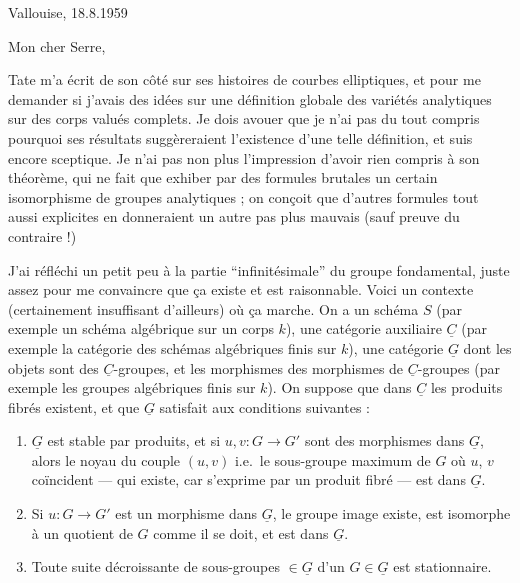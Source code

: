 \documentclass[11pt,a4paper]{article}
\begin{document}

Vallouise, 18.8.1959

Mon cher Serre,

Tate m'a écrit de son côté \struck{\ill{}} sur ses histoires de courbes
elliptiques, et pour me demander si j'avais des idées sur une définition
globale des variétés analytiques sur des corps valués complets. Je dois avouer
que je n'ai pas du tout compris pourquoi ses résultats suggèreraient
l'existence d'une telle définition, et suis encore sceptique. Je n'ai pas non
plus l'impression d'avoir rien compris à son théorème, qui \struck{\ill{}} ne
fait que exhiber par des formules brutales un certain isomorphisme de groupes
analytiques ; \struck{\ill{}} on conçoit que d'autres formules tout aussi
explicites en donneraient un autre pas plus mauvais (sauf preuve du contraire !)

J'ai réfléchi un petit peu à la partie ``infinitésimale'' du groupe
fondamental, juste assez pour me convaincre que ça existe et est raisonnable.
Voici un contexte (certainement insuffisant d'ailleurs) où ça marche. On a un
schéma $S$  (par exemple un schéma algébrique sur un corps $k$),
une catégorie auxiliaire $\underline{C}$ (par exemple la catégorie des schémas
algébriques finis sur $k$), une catégorie \struck{\ill{}} $\underline{G}$ dont
les objets sont des $\underline{C}$-groupes, et les morphismes des morphismes
de $\underline{C}$-groupes (par exemple les groupes algébriques finis sur $k$).
On suppose que dans $\underline{C}$ les produits fibrés existent, et que
$\underline{G}$ satisfait aux conditions suivantes :

\begin{enumerate}
\item[(i)] $\underline{G}$ est stable par produits, et si $u, v : G \to G'$
sont des morphismes dans $\underline{G}$, alors le noyau du couple $(u,v)$
i.e.\ le sous-groupe \struck{\ill{}} maximum de $G$ où $u$, $v$ coïncident ---
qui existe, car s'exprime par un produit fibré --- est dans $\underline{G}$.
\item[(ii)] Si $u : G \to G'$ est un morphisme dans $\underline{G}$,
\struck{\ill{}} le groupe image existe, est isomorphe à un quotient de $G$
comme il se doit, et est dans $\underline{G}$.
\item[(iii)] Toute suite décroissante de sous-groupes \struck{\ill{}} $\in
\underline{G}$ d'un $G \in \underline{G}$ est stationnaire.
\end{enumerate}
\end{document}
